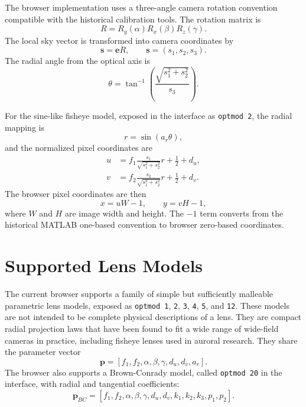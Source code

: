 \documentclass[11pt]{article}
\begin{document}
The browser implementation uses a three-angle camera rotation convention
compatible with the historical calibration tools. The rotation matrix is
\begin{equation}
  R = R_y(\alpha) R_x(\beta) R_z(\gamma).
\end{equation}
The local sky vector is transformed into camera coordinates by
\begin{equation}
  \mathbf{s} = \mathbf{e} R,
  \qquad
  \mathbf{s} = (s_1, s_2, s_3).
\end{equation}
The radial angle from the optical axis is
\begin{equation}
  \theta = \tan^{-1}\left(\frac{\sqrt{s_1^2+s_2^2}}{s_3}\right).
\end{equation}

For the sine-like fisheye model, exposed in the interface as
\texttt{optmod 2}, the radial mapping is
\begin{equation}
  r = \sin(a_r \theta),
\end{equation}
and the normalized pixel coordinates are
\begin{align}
  u &= f_1 \frac{s_1}{\sqrt{s_1^2+s_2^2}} r + \frac{1}{2} + d_u, \\
  v &= f_2 \frac{s_2}{\sqrt{s_1^2+s_2^2}} r + \frac{1}{2} + d_v.
\end{align}
The browser pixel coordinates are then
\begin{equation}
  x = u W - 1, \qquad y = v H - 1,
\end{equation}
where \(W\) and \(H\) are image width and height. The \(-1\) term converts from
the historical MATLAB one-based convention to browser zero-based coordinates.

\section{Supported Lens Models}

The current browser supports a family of simple but sufficiently malleable
parametric lens models, exposed as \texttt{optmod 1}, \texttt{2}, \texttt{3},
\texttt{4}, \texttt{5}, and \texttt{12}. These models are not intended to be
complete physical descriptions of a lens. They are compact radial projection
laws that have been found to fit a wide range of wide-field cameras in
practice, including fisheye lenses used in auroral research. They share the
parameter vector
\begin{equation}
  \mathbf{p} = [f_1, f_2, \alpha, \beta, \gamma, d_u, d_v, a_r].
\end{equation}
The browser also supports a Brown-Conrady model, called \texttt{optmod 20} in
the interface, with radial and tangential coefficients:
\begin{equation}
  \mathbf{p}_{BC} =
  [f_1, f_2, \alpha, \beta, \gamma, d_u, d_v,
   k_1, k_2, k_3, p_1, p_2].
\end{equation}
\end{document}
